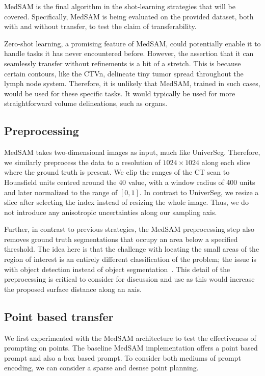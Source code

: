 \documentclass[12pt,twoside]{report}
\begin{document}
MedSAM is the final algorithm in the shot-learning strategies that will be covered. Specifically, MedSAM is being evaluated on the provided dataset, both with and without transfer, to test the claim of transferability.

Zero-shot learning, a promising feature of MedSAM, could potentially enable it to handle tasks it has never encountered before. However, the assertion that it can seamlessly transfer without refinements is a bit of a stretch. This is because certain contours, like the CTVn, delineate tiny tumor spread throughout the lymph node system. Therefore, it is unlikely that MedSAM, trained in such cases, would be used for these specific tasks. It would typically be used for more straightforward volume delineations, such as organs.

\subsection{Preprocessing}

MedSAM takes two-dimensional images as input, much like UniverSeg. Therefore, we similarly preprocess the data to a resolution of $1024 \times 1024$ along each slice where the ground truth is present. We clip the ranges of the CT scan to Hounsfield units centred around the 40 value, with a window radius of 400 units and later normalized to the range of $[0,1]$. In contrast to UniverSeg, we resize a slice after selecting the index instead of resizing the whole image. Thus, we do not introduce any anisotropic uncertainties along our sampling axis.

Further, in contrast to previous strategies, the MedSAM preprocessing step also removes ground truth segmentations that occupy an area below a specified threshold. The idea here is that the challenge with locating the small areas of the region of interest is an entirely different classification of the problem; the issue is with object detection instead of object segmentation~\cite{SAM, Ma2024}. This detail of the preprocessing is critical to consider for discussion and use as this would increase the proposed surface distance along an axis.

\subsection{Point based transfer}

We first experimented with the MedSAM architecture to test the effectiveness of prompting on points. The baseline MedSAM implementation offers a point based prompt and also a box based prompt. To consider both mediums of prompt encoding, we can consider a sparse and desnse point planning. %
\end{document}
